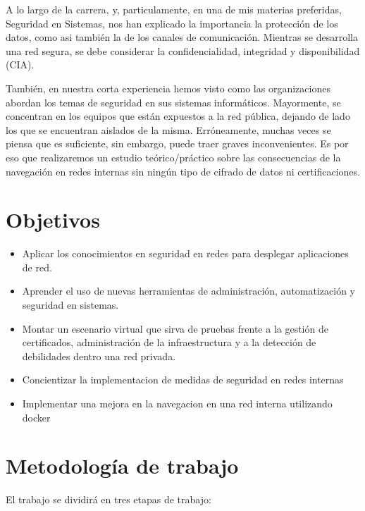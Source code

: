 %


A lo largo de la carrera, y, particulamente, en una de mis materias preferidas, 
Seguridad en Sistemas, nos han explicado la importancia la protección de los 
datos, como asi también la de los canales de comunicación. Mientras se desarrolla 
una red segura, se debe considerar la confidencialidad, integridad y disponibilidad 
(CIA). 

También, en nuestra corta experiencia hemos visto como las organizaciones 
abordan los temas de seguridad en sus sistemas informáticos. Mayormente, se 
concentran en los equipos que están expuestos a la red pública, dejando de 
lado los que se encuentran aislados de la misma. Erróneamente, muchas veces 
se piensa que es suficiente, sin embargo, puede traer graves inconvenientes. 
Es por eso que realizaremos un estudio teórico/práctico sobre las consecuencias 
de la navegación en redes internas sin ningún tipo de cifrado de datos ni 
certificaciones.

\section{Objetivos}

\begin{itemize}
    \setlength\itemsep{-0.6em}
    \item Aplicar los conocimientos en seguridad en redes para desplegar aplicaciones de red.
    \item Aprender el uso de nuevas herramientas de administración, automatización y seguridad en sistemas.
    \item Montar un escenario virtual que sirva de pruebas frente a la gestión de certificados, administración de la infraestructura y a la detección de debilidades dentro una red privada.
    \item Concientizar la implementacion de medidas de seguridad en redes internas
    \item Implementar una mejora en la navegacion en una red interna utilizando docker
\end{itemize}


\section{Metodología de trabajo}
El trabajo se dividirá en tres etapas de trabajo:

